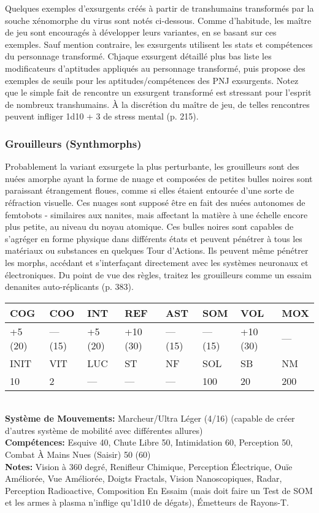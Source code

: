 Quelques exemples d'exsurgents créés à partir de transhumains transformés par la souche xénomorphe du virus sont notés ci-dessous. Comme d'habitude, les maître de jeu sont encouragés à développer leurs variantes, en se basant sur ces exemples. Sauf mention contraire, les exsurgents utilisent les stats et compétences du personnage transformé. Chjaque exsurgent détaillé plus bas liste les modificateurs d'aptitudes appliqués au personnage transformé, puis propose des exemples de seuils pour les aptitudes/compétences des PNJ exsurgents. Notez que le simple fait de rencontre un exsurgent transformé est stressant pour l'esprit de nombreux transhumains. À la discrétion du maître de jeu, de telles rencontres peuvent infliger 1d10 + 3 de stress mental (p. 215). 

\subsubsection{Grouilleurs (Synthmorphs)} 

Probablement la variant exsurgete la plus perturbante, les grouilleurs sont des nuées amorphe ayant la forme de nuage et composées de petites bulles noires sont paraissant étrangement floues, comme si elles étaient entourée d'une sorte de réfraction visuelle. Ces nuages sont supposé être en fait des nuées autonomes de femtobots - similaires aux nanites, mais affectant la matière à une échelle encore plus petite, au niveau du noyau atomique. Ces bulles noires sont capables de s'agréger en forme physique dans différents états et peuvent pénétrer à tous les matériaux ou substances en quelques Tour d'Actions. Ils peuvent même pénétrer les morphs, accédant et s'interfaçant directement avec les systèmes neuronaux et électroniques. Du point de vue des règles, traitez les grouilleurs comme un essaim denanites auto-réplicants (p. 383).\\ \begin{tabular}{|l|l|l|l|l|l|l|l|} \hline

COG &COO &INT &REF &AST &SOM &VOL &MOX \\ \hline

+5 (20) &— (15) &+5 (20) &+10 (30) &— (15) &— (15) &+10 (30) &— \\ \hline

INIT &VIT &LUC &ST &NF &SOL &SB &NM \\ \hline

10 &2 &— &— &— &100 &20 &200 \\ \hline

\end{tabular} \\ \textbf{Système de Mouvements: }Marcheur/Ultra Léger (4/16) (capable de créer d'autres système de mobilité avec différentes allures) \\ \textbf{Compétences:} Esquive 40, Chute Libre 50, Intimidation 60, Perception 50, Combat À Mains Nues (Saisir) 50 (60) \\ \textbf{Notes: }Vision à 360 degré, Renifleur Chimique, Perception Électrique, Ouïe Améliorée, Vue Améliorée, Doigts Fractals, Vision Nanoscopiques, Radar, Perception Radioactive, Composition En Essaim (mais doit faire un Test de SOM et les armes à plasma n'inflige qu'1d10 de dégats), Émetteurs de Rayons-T. 

